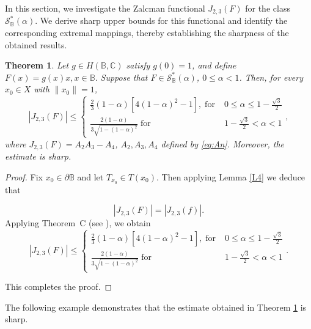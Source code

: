 \documentclass[11pt, reqno]{amsart}
\newtheorem{theo}{Theorem}[section]
\numberwithin{equation}{section}
\begin{document}
In this section, we investigate the Zalcman functional $J_{2,3}(F)$ for the class $\mathcal{S}^*_\mathbb{B}(\alpha)$. We derive sharp upper bounds for this functional and identify the corresponding extremal mappings, thereby establishing the sharpness of the obtained results.
\begin{theo}\label{T3}
Let $g\in H(\mathbb{B},\mathbb{C})$ satisfy $g(0)=1$, and define $F(x)=g(x)x, x\in\mathbb{B}.$
Suppose that $F\in\mathcal{S}^*_\mathbb{B}(\alpha)$, $0\leq \alpha <1$. Then, for every
$x_{0}\in X$ with $\|x_{0}\|=1$,
\[
|J_{2,3}(F)|\leq \begin{cases} \frac{2}{3}(1-\alpha)[4(1-\alpha)^2-1], \;\text{for}\; & 0\leq \alpha\leq  1-\frac{\sqrt 3}{2}\\
         \frac{2(1-\alpha)}{3\sqrt{1-(1-\alpha)^2}} \;\text{for}\; &  1-\frac{\sqrt 3}{2}<\alpha <1
\end{cases},
\]
where $J_{2,3}(F)=A_2A_3-A_4$,  $A_{2},A_{3},A_{4}$ defined by
\eqref{eq:An}. Moreover, the estimate is sharp.
\end{theo}

\begin{proof}
 Fix $x_0\in \partial{\mathbb{B}}$ and let $T_{x_0}\in T(x_0)$. Then applying Lemma \ref{L4} we deduce that

\[
|J_{2,3}(F)|
=
|J_{2,3}(f)|.
\]
Applying Theorem~C (see \cite[Theorem 2.1]{CKKLS2018}),
we obtain
\[
|J_{2,3}(F)| \leq \begin{cases} \frac{2}{3}(1-\alpha)[4(1-\alpha)^2-1], \;\text{for}\; & 0\leq \alpha\leq  1-\frac{\sqrt 3}{2}\\
         \frac{2(1-\alpha)}{3\sqrt{1-(1-\alpha)^2}} \;\text{for}\; &  1-\frac{\sqrt 3}{2}<\alpha <1
\end{cases}.\]

This completes the proof.
\end{proof}

The following example demonstrates that the estimate obtained in Theorem \ref{T3} is sharp.
\end{document}
